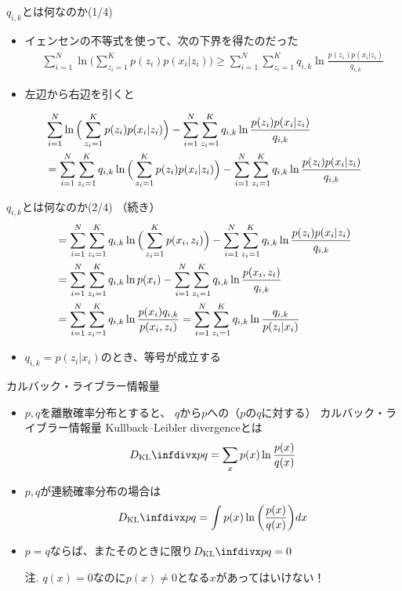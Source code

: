 \documentclass[aspectratio=169,unicode,dvipdfmx,14pt]{beamer}
\begin{document}
\begin{frame}{$q_{i,k}$とは何なのか(1/4)}
\begin{itemize}
\item イェンセンの不等式を使って、次の下界を得たのだった
\begin{align}
\sum_{i=1}^N \ln \Big( \sum_{z_i=1}^K p(z_i) p(x_i | z_i) \Big)
\geq 
\sum_{i=1}^N \sum_{z_i=1}^K q_{i,k} \ln\frac{p(z_i) p(x_i | z_i)}{q_{i,k}}
\end{align}
\item 左辺から右辺を引くと
\end{itemize}
\begin{align}
& \sum_{i=1}^N \ln \Big( \sum_{z_i=1}^K p(z_i) p(x_i | z_i) \Big)
- \sum_{i=1}^N \sum_{z_i=1}^K q_{i,k} \ln\frac{p(z_i) p(x_i | z_i)}{q_{i,k}}
\notag \\ &
= \sum_{i=1}^N \sum_{z_i=1}^K q_{i,k} \ln \Big( \sum_{z_i=1}^K p(z_i) p(x_i | z_i) \Big)
- \sum_{i=1}^N \sum_{z_i=1}^K q_{i,k} \ln\frac{p(z_i) p(x_i | z_i)}{q_{i,k}}
\notag
\end{align}
\end{frame}

\begin{frame}{$q_{i,k}$とは何なのか(2/4)}
（続き）
\begin{align}
&
= \sum_{i=1}^N \sum_{z_i=1}^K q_{i,k} \ln \Big( \sum_{z_i=1}^K p(x_i, z_i) \Big)
- \sum_{i=1}^N \sum_{z_i=1}^K q_{i,k} \ln\frac{p(z_i) p(x_i | z_i)}{q_{i,k}}
\notag \\
& = \sum_{i=1}^N \sum_{z_i=1}^K q_{i,k} \ln p(x_i)
- \sum_{i=1}^N \sum_{z_i=1}^K q_{i,k} \ln\frac{p(x_i, z_i)}{q_{i,k}}
\notag \\& 
= \sum_{i=1}^N \sum_{z_i=1}^K q_{i,k} \ln \frac{p(x_i) q_{i,k}}{p(x_i , z_i)}
= \sum_{i=1}^N \sum_{z_i=1}^K q_{i,k} \ln \frac{q_{i,k}}{p(z_i | x_i)}
\label{eq:diff}
\end{align}
\begin{itemize}
\item $q_{i,k}=p(z_i | x_i)$のとき、等号が成立する
\end{itemize}
\end{frame}


\begin{frame}{カルバック・ライブラー情報量}
\begin{itemize}
\item $p,q$を離散確率分布とすると、
$q$から$p$への{\small（$p$の$q$に対する）}
カルバック・ライブラー情報量 {\small Kullback–Leibler divergence}とは
\begin{align}
\infdiv{p}{q} = \sum_{x} p(x) \ln \frac{p(x)}{q(x)}
\end{align}
\item $p,q$が連続確率分布の場合は
\begin{align}
\infdiv{p}{q} = \int p(x) \ln \bigg( \frac{p(x)}{q(x)} \bigg) dx
\end{align}
\item $p=q$ならば、またそのときに限り$\infdiv{p}{q} = 0$
\item[注.] $q(x) = 0$なのに$p(x) \neq 0$となる$x$があってはいけない！
\end{itemize}
\end{frame}
\end{document}
